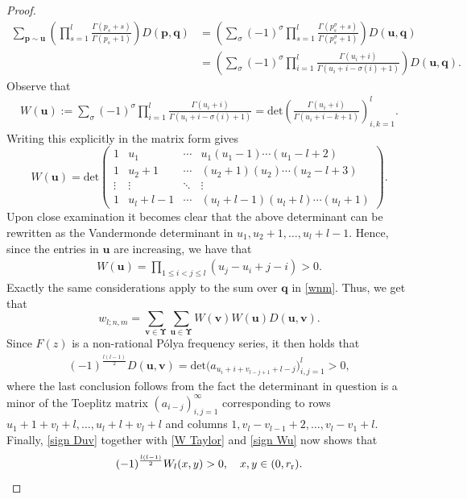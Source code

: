 \documentclass[10pt,a4paper]{amsart}
\renewcommand{\det}{\mathrm{det}}
\begin{document}
\begin{proof}
\begin{align}
\sum_{\boldsymbol p\sim \boldsymbol u} \left(\prod_{s=1}^l\frac{\Gamma(p_s+s)}{\Gamma(p_s+1)}\right)D(\boldsymbol p,\boldsymbol q)& = \left(\sum_\sigma (-1)^\sigma \prod_{s=1}^l\frac{\Gamma(p_s^\sigma+s)}{\Gamma(p_s^\sigma+1)}\right) D(\boldsymbol u,\boldsymbol q) \\
& = \left(\sum_\sigma (-1)^\sigma \prod_{i=1}^l \frac{\Gamma(u_i+i)}{\Gamma(u_i+i-\sigma(i)+1)}\right) D(\boldsymbol u,\boldsymbol q).
\end{align}
Observe that
\begin{eqnarray*}
W(\boldsymbol u) := 
\sum_\sigma (-1)^\sigma \prod_{i=1}^l \frac{\Gamma(u_i+i)}{\Gamma(u_i+i-\sigma(i)+1)} =
\det\left( \frac{\Gamma(u_i+i)}{\Gamma(u_i+i-k+1)} \right)_{i,k=1}^l.
\end{eqnarray*}
Writing this explicitly in the matrix form gives
\[
W(\boldsymbol u) = \det\begin{pmatrix}
1 & u_1 & \cdots & u_1(u_1-1)\cdots(u_1-l+2) \\
1 & u_2+1 & \cdots & (u_2+1)(u_2)\cdots(u_2-l+3) \\
\vdots & \vdots & \ddots & \vdots \\
1 & u_l+l-1 & \cdots & (u_l+l-1)(u_l+l)\cdots(u_l+1)
\end{pmatrix}.
\]
Upon close examination it becomes clear that the above determinant can be rewritten as the Vandermonde determinant in \( u_1,u_2+1,\ldots,u_l+l-1 \). Hence, since the entries in $\boldsymbol u$ are increasing, we have that
\begin{align}
\label{sign Wu}
W(\boldsymbol u) = \prod_{1\leq i<j\leq l} (u_j-u_i+j-i)>0.
\end{align}
Exactly the same considerations apply to the sum over \( \boldsymbol q \) in \eqref{wnm}. Thus, we get that
\[
w_{l;n,m} = \sum_{\boldsymbol v\in \boldsymbol\Upsilon}\sum_{\boldsymbol u\in \boldsymbol\Upsilon} W(\boldsymbol v)W(\boldsymbol u) D(\boldsymbol u,\boldsymbol v).
\]
Since \( F(z) \) is a non-rational P\'olya frequency series, it then holds that
\begin{align}
\label{sign Duv}
(-1)^{\frac{l(l-1)}{2}}D(\boldsymbol u,\boldsymbol v) = \det\big( a_{u_i+i+v_{l-j+1}+l-j} \big)_{i,j=1}^l>0,
\end{align}
where the last conclusion follows from the fact the determinant in question is a minor of the Toeplitz matrix \( (a_{i-j})_{i,j=1}^\infty \) corresponding to rows \( u_1+1+v_l+l,\ldots,u_l+l+v_l+l\) and columns \( 1,v_l-v_{l-1}+2,\ldots,v_l-v_1+l\). Finally, \eqref{sign Duv} together with \eqref{W Taylor} and \eqref{sign Wu} now shows that 
\[
(-1)^{\frac{l(l-1)}{2}} W_l(x,y)>0,  \quad x,y\in(0,r_{\mathrm r}). \qedhere
\]
\end{proof}
\end{document}
